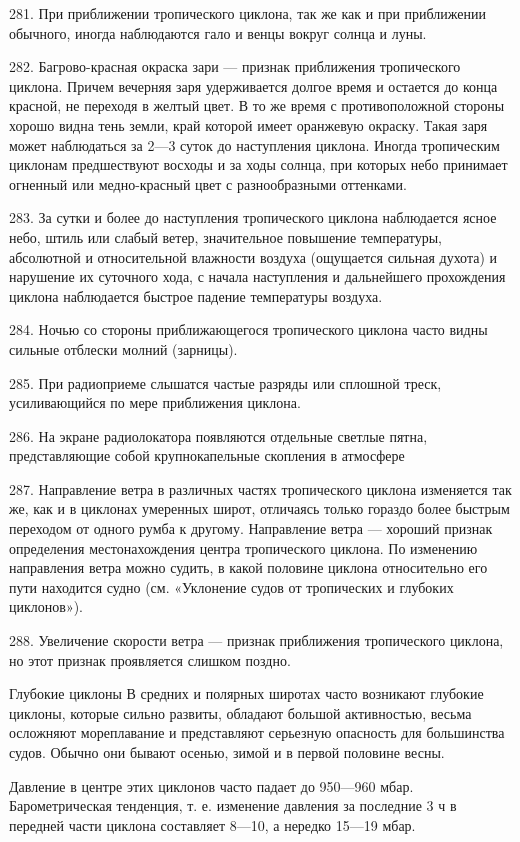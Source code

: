 281. При приближении тропического циклона, так же как и при приближении обычного, иногда наблюдаются гало и венцы вокруг солнца и луны.

282. Багрово-красная окраска зари — признак приближения тропического циклона. Причем вечерняя заря удерживается долгое время и остается до конца красной, не переходя в желтый цвет. В то же время с противоположной стороны хорошо видна тень земли, край которой имеет оранжевую окраску. Такая заря может наблюдаться за 2—3 суток до наступления циклона. Иногда тропическим циклонам предшествуют восходы и за ходы солнца, при которых небо принимает огненный или медно-красный цвет с разнообразными оттенками.

283. За сутки и более до наступления тропического циклона наблюдается ясное небо, штиль или слабый ветер, значительное повышение температуры, абсолютной и относительной влажности воздуха (ощущается сильная духота) и нарушение их суточного хода, с начала наступления и дальнейшего прохождения циклона наблюдается быстрое падение температуры воздуха.

284. Ночью со стороны приближающегося тропического циклона часто видны сильные отблески молний (зарницы).

285. При радиоприеме слышатся частые разряды или сплошной треск, усиливающийся по мере приближения циклона.

286. На экране радиолокатора появляются отдельные светлые пятна, представляющие собой крупнокапельные скопления в атмосфере

287. Направление ветра в различных частях тропического циклона изменяется так же, как и в циклонах умеренных широт, отличаясь только гораздо более быстрым переходом от одного румба к другому. Направление ветра — хороший признак определения местонахождения центра тропического циклона. По изменению направления ветра можно судить, в какой половине циклона относительно его пути находится судно (см. «Уклонение судов от тропических и глубоких циклонов»).

288. Увеличение скорости ветра — признак приближения тропического циклона, но этот признак проявляется слишком поздно.

Глубокие циклоны
В средних и полярных широтах часто возникают глубокие циклоны, которые сильно развиты, обладают большой активностью, весьма осложняют мореплавание и представляют серьезную опасность для большинства судов. Обычно они бывают осенью, зимой и в первой половине весны.

Давление в центре этих циклонов часто падает до 950—960 мбар. Барометрическая тенденция, т. е. изменение давления за последние 3 ч в передней части циклона составляет 8—10, а нередко 15—19 мбар.

